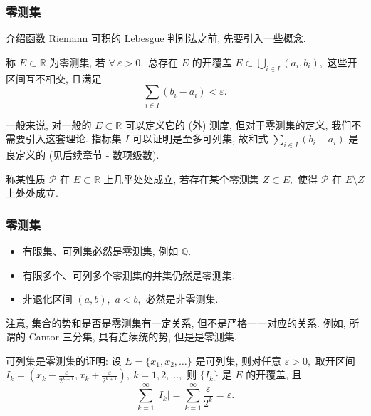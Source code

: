 
\begin{frame}
\frametitle{零测集}

介绍函数 Riemann 可积的 Lebesgue 判别法之前, 先要引入一些概念.

\begin{Def}[零测集]
称 $E \subset \mathbb{R}$ 为零测集, 若 $\forall~\varepsilon > 0,$ 总存在 $E$ 的开覆盖 $\displaystyle E \subset \bigcup_{i \in I} (a_i, b_i),$ 这些开区间互不相交, 且满足
\[\sum\limits_{i \in I} (b_i - a_i) < \varepsilon.\]
\end{Def}

一般来说, 对一般的 $E \subset \mathbb{R}$ 可以定义它的 (外) 测度, 但对于零测集的定义, 我们不需要引入这套理论. 指标集 $I$ 可以证明是至多可列集, 故和式 $\sum\limits_{i \in I} (b_i - a_i)$ 是良定义的 (见后续章节 - 数项级数).

\pause

\begin{Def}[几乎处处成立的性质]
称某性质 $\mathcal{P}$ 在 $E \subset \mathbb{R}$ 上几乎处处成立, 若存在某个零测集 $Z \subset E,$ 使得 $\mathcal{P}$ 在 $E \setminus Z$ 上处处成立.
\end{Def}

\end{frame}


\begin{frame}
\frametitle{零测集}

\begin{eg}[一些典型的零测集和典型的非零测集]
\begin{itemize}
\item 有限集、可列集必然是零测集, 例如 $\mathbb{Q}.$
\pause
\item 有限多个、可列多个零测集的并集仍然是零测集.
\pause
\item 非退化区间 $(a, b),$ $a < b,$ 必然是非零测集.
\end{itemize}
\end{eg}

\pause

\alert{注意}, 集合的势和是否是零测集有一定关系, 但不是严格一一对应的关系. 例如, 所谓的 Cantor 三分集, 具有连续统的势, 但是是零测集.

\pause
\vspace{1em}

{\color{red}} 可列集是零测集的证明: 设 $E = \{x_1, x_2, \dots\}$ 是可列集, 则对任意 $\varepsilon > 0,$ 取开区间 $I_k = \left( x_k - \frac{\varepsilon}{2^{k+1}}, x_k + \frac{\varepsilon}{2^{k+1}} \right), ~ k = 1, 2, \dots,$ 则 $\{I_k\}$ 是 $E$ 的开覆盖, 且
\[
\sum_{k=1}^{\infty} |I_k| = \sum_{k=1}^{\infty} \frac{\varepsilon}{2^k} = \varepsilon.
\]

\end{frame}

